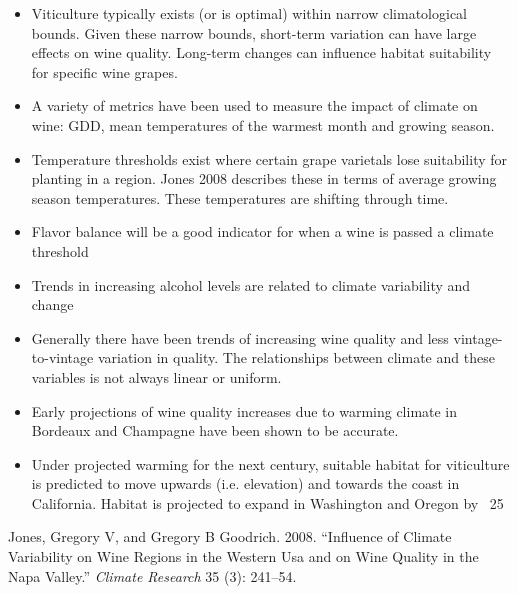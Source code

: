 \begin{itemize}
\tightlist
  \item
    Viticulture typically exists (or is optimal) within narrow climatological bounds. Given these narrow bounds, short-term variation can have large effects on wine quality. Long-term changes can influence habitat suitability for specific wine grapes.
  \item
    A variety of metrics have been used to measure the impact of climate on wine: GDD, mean temperatures of the warmest month and growing season.
  \item
    Temperature thresholds exist where certain grape varietals lose suitability for planting in a region. Jones 2008 describes these in terms of average growing season temperatures. These temperatures are shifting through time.
  \item
    Flavor balance will be a good indicator for when a wine is passed a climate threshold
  \item
    Trends in increasing alcohol levels are related to climate variability and change
  \item
    Generally there have been trends of increasing wine quality and less vintage-to-vintage variation in quality. The relationships between climate and these variables is not always linear or uniform. 
  \item
    Early projections of wine quality increases due to warming climate in Bordeaux and Champagne have been shown to be accurate.
  \item
    Under projected warming for the next century, suitable habitat for viticulture is predicted to move upwards (i.e. elevation) and towards the coast in California. Habitat is projected to expand in Washington and Oregon by ~25%
  
\end{itemize}

\hypertarget{ref-jones2008}{}
Jones, Gregory V, and Gregory B Goodrich. 2008. ``Influence of Climate
Variability on Wine Regions in the Western Usa and on Wine Quality in
the Napa Valley.'' \emph{Climate Research} 35 (3): 241--54.

